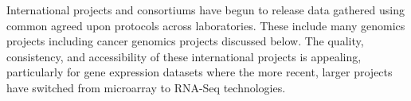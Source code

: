%
International projects and consortiums have begun to release data gathered using common agreed upon protocols across laboratories.  %
These include many \glspl{genomic} projects including cancer \glspl{genomic} projects discussed below. The quality, consistency, and accessibility of these international projects is appealing, particularly for \gls{gene expression} datasets where the more recent, larger projects have switched from \gls{microarray} to \gls{RNA-Seq} technologies. %

